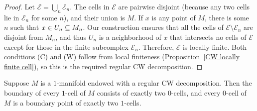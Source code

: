 \begin{proof}
Let $\mathcal{E}=\bigcup_n\mathcal{E}_n$. The cells in $\mathcal{E}$ are pairwise disjoint (because any two cells lie in $\mathcal{E}_n$ for some $n$), and their union is $M$. If $x$ is any point of $M$, there is some $n$ such that $x\in U_n\subseteq M_n$. Our construction ensures that all the cells of $\mathcal{E}\setminus\mathcal{E}_n$ are disjoint from $M_n$, and thus $U_n$ is a neighborhood of $x$ that intersects no cells of $\mathcal{E}$ except for those in the finite subcomplex  $\mathcal{E}_n$. Therefore, $\mathcal{E}$ is locally finite. Both conditions (C) and (W) follow from local finiteness (Proposition~\ref{CW locally finite cell}), so this is the required regular CW decomposition.
\end{proof}
\begin{lemma}\label{one mani 0-cell 1-cell}
Suppose $M$ is a $1$-manifold endowed with a regular CW decomposition. Then the boundary of every $1$-cell of $M$ consists of exactly two $0$-cells, and
every $0$-cell of $M$ is a boundary point of exactly two $1$-cells.
\end{lemma}
